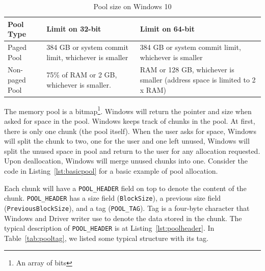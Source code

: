 \begin{center}
\begin{table}[h]
\begin{tabular}{|l|p{5cm}|p{5cm}|}
\hline
Pool Type & Limit on 32-bit & Limit on 64-bit \\ \hline
Paged Pool & 384 GB or system commit limit, whichever is smaller & 384 GB or system commit limit, whichever is smaller \\ \hline
Non-paged Pool & 75\% of RAM or 2 GB, whichever is smaller. & RAM or 128 GB, whichever is smaller (address space is limited to 2 x RAM) \\ \hline
\end{tabular}
\caption{Pool size on Windows 10}
\label{tab:poolsize}
\end{table}
\end{center}

The memory pool is a bitmap\footnote{An array of bits}. Windows will return the pointer and size when asked for space in the pool. Windows keeps track of chunks in the pool. At first, there is only one chunk (the pool itself). When the user asks for space, Windows will split the chunk to two, one for the user and one left unused, Windows will split the unused space in pool and return to the user for any allocation requested. Upon deallocation, Windows will merge unused chunks into one. Consider the code in Listing~\ref{lst:basicpool} for a basic example of pool allocation.

Each chunk will have a \texttt{POOL\_HEADER} field on top to denote the content of the chunk. \texttt{POOL\_HEADER} has a size field (\texttt{BlockSize}), a previous size field (\texttt{PreviousBlockSize}), and a tag (\texttt{POOL\_TAG}). Tag is a four-byte character that Windows and Driver writer use to denote the data stored in the chunk. The typical description of \texttt{POOL\_HEADER} is at Listing~\ref{lst:poolheader}. In Table~\ref{tab:pooltag}, we listed some typical structure with its tag.






